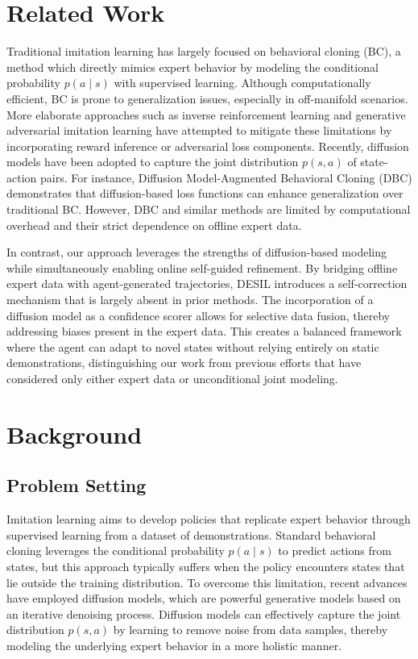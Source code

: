 \documentclass{article} %
\begin{document}
\section{Related Work}
\label{sec:related}
Traditional imitation learning has largely focused on behavioral cloning (BC), a method which directly mimics expert behavior by modeling the conditional probability $p(a\mid s)$ with supervised learning. Although computationally efficient, BC is prone to generalization issues, especially in off-manifold scenarios. More elaborate approaches such as inverse reinforcement learning\citep{Kang2018} and generative adversarial imitation learning\citep{Halko2011} have attempted to mitigate these limitations by incorporating reward inference or adversarial loss components. Recently, diffusion models have been adopted to capture the joint distribution $p(s,a)$ of state-action pairs. For instance, Diffusion Model-Augmented Behavioral Cloning (DBC)\citep{Maraqa2020} demonstrates that diffusion-based loss functions can enhance generalization over traditional BC. However, DBC and similar methods are limited by computational overhead and their strict dependence on offline expert data.

In contrast, our approach leverages the strengths of diffusion-based modeling while simultaneously enabling online self-guided refinement. By bridging offline expert data with agent-generated trajectories, DESIL introduces a self-correction mechanism that is largely absent in prior methods. The incorporation of a diffusion model as a confidence scorer allows for selective data fusion, thereby addressing biases present in the expert data. This creates a balanced framework where the agent can adapt to novel states without relying entirely on static demonstrations, distinguishing our work from previous efforts that have considered only either expert data or unconditional joint modeling.

\section{Background}
\label{sec:background}
\subsection{Problem Setting}
Imitation learning aims to develop policies that replicate expert behavior through supervised learning from a dataset of demonstrations. Standard behavioral cloning leverages the conditional probability $p(a\mid s)$ to predict actions from states, but this approach typically suffers when the policy encounters states that lie outside the training distribution. To overcome this limitation, recent advances have employed diffusion models, which are powerful generative models based on an iterative denoising process. Diffusion models can effectively capture the joint distribution $p(s,a)$ by learning to remove noise from data samples, thereby modeling the underlying expert behavior in a more holistic manner.
\end{document}
